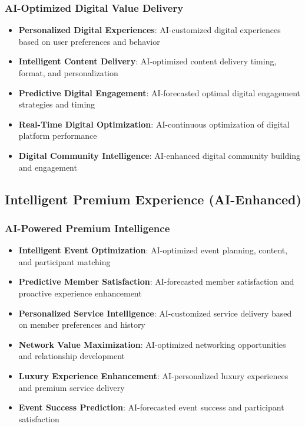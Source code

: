\subsubsection{AI-Optimized Digital Value Delivery}

\begin{itemize}
    \item \textbf{Personalized Digital Experiences}: AI-customized digital experiences based on user preferences and behavior
    \item \textbf{Intelligent Content Delivery}: AI-optimized content delivery timing, format, and personalization
    \item \textbf{Predictive Digital Engagement}: AI-forecasted optimal digital engagement strategies and timing
    \item \textbf{Real-Time Digital Optimization}: AI-continuous optimization of digital platform performance
    \item \textbf{Digital Community Intelligence}: AI-enhanced digital community building and engagement
\end{itemize}

\subsection{Intelligent Premium Experience (AI-Enhanced)}

\subsubsection{AI-Powered Premium Intelligence}

\begin{itemize}
    \item \textbf{Intelligent Event Optimization}: AI-optimized event planning, content, and participant matching
    \item \textbf{Predictive Member Satisfaction}: AI-forecasted member satisfaction and proactive experience enhancement
    \item \textbf{Personalized Service Intelligence}: AI-customized service delivery based on member preferences and history
    \item \textbf{Network Value Maximization}: AI-optimized networking opportunities and relationship development
    \item \textbf{Luxury Experience Enhancement}: AI-personalized luxury experiences and premium service delivery
    \item \textbf{Event Success Prediction}: AI-forecasted event success and participant satisfaction
\end{itemize}

